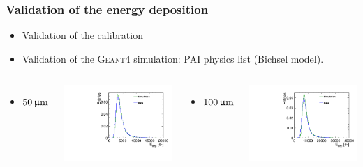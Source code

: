 \begin{frame}
  \frametitle{Validation of the energy deposition}

  \begin{itemize}
  \item Validation of the calibration
  \item Validation of the \textsc{Geant4} simulation: PAI physics list
    (Bichsel model).
  \end{itemize}

  \begin{columns}
    \begin{itemize}
    \item $50\,\upmu\mathrm{m}$
    \end{itemize}
    \centering
    \includegraphics[width=\textwidth]{../figures/TestBeam/50micron_Edep.pdf}

    \begin{itemize}
    \item $100\,\upmu\mathrm{m}$
    \end{itemize}
    \centering
    \includegraphics[width=\textwidth]{../figures/TestBeam/100micron_Edep.pdf}


\end{columns}
\end{frame}
